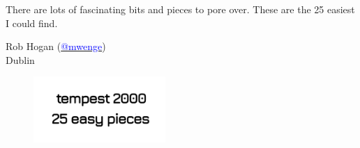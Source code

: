 There are lots of fascinating bits and pieces to pore over. These are the 25 easiest I could find.


Rob Hogan (\href{https://mastodon.social/@mwenge}{\textcolor{blue}{@mwenge}})\\
Dublin \the\year{} \\

\clearpage
\vspace*{\fill}
\begin{figure}[H]
    \centering
      \includegraphics[width=5cm]{src/cover/title_page.png}%
\end{figure}
\vspace*{\fill}
\thispagestyle{empty}%
\clearpage

